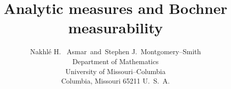 \setlength\textwidth{6in}
\setlength\oddsidemargin{0.25in}
\topmargin -20mm
\footskip 12mm
\textheight 56pc
\def\Bbb#1{{\mathchoice{\mbox{\bf #1}}{\mbox{\bf #1}}%
{\mbox{$\scriptstyle \bf #1$}}{\mbox{$\scriptscriptstyle \bf #1$}}}}
\def\N{\Bbb N}
\def\R{\Bbb R}
\def\C{\Bbb C}
\def\D{\Bbb D}
\def\Z{\Bbb Z}
\def\T{\Bbb T}
\def\Q{\Bbb Q}
\def\E{\Bbb E}
\def\O{\Omega}
\def\sgn{{\rm sgn}}
\def\supp{{\rm supp}}
\def\H{{\cal H}_P}
\def\e{\epsilon}
\def\A{{\cal A}}
\def\cL{{\cal L}}
\def\cB{{\cal B}}
\def\cT{{\cal T}}
\def\Linfg{L^\infty (G)}
\def\Hinfg{H^\infty (G)}
\def\spec{{\rm spec}}


\title{Analytic measures and Bochner measurability}
\author{Nakhl\'e H. \ Asmar\ and\ Stephen J.\ Montgomery--Smith\\
Department of Mathematics\\
University of
Missouri--Columbia\\
Columbia, Missouri 65211  U.\ S.\ A.
}
\date{}
\maketitle

